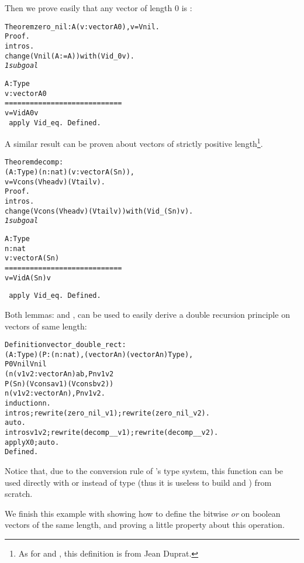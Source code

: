 \documentclass[11pt]{article}
\begin{document}
Then we prove easily that any vector of length 0 is :

\begin{alltt}
Theorem zero_nil : {\prodsym} A (v:vector A 0), v = Vnil.
Proof.
 intros.
 change (Vnil (A:=A)) with (Vid _ 0 v). 
\it
1 subgoal
  
  A : Type
  v : vector A 0
  ============================
   v = Vid A 0 v
\tt
 apply Vid_eq.
Defined.
\end{alltt}

A similar result can be proven about vectors of strictly positive
length\footnote{As for  and , this definition 
is from Jean Duprat.}.

\begin{alltt}


Theorem decomp :
  {\prodsym} (A : Type) (n : nat) (v : vector A (S n)),
  v = Vcons (Vhead v) (Vtail v).
Proof.
 intros.
 change (Vcons (Vhead v) (Vtail v)) with (Vid _  (S n) v).
\it
 1 subgoal
  
  A : Type
  n : nat
  v : vector A (S n)
  ============================
   v = Vid A (S n) v

\tt{} apply Vid_eq.
Defined.
\end{alltt}


Both lemmas:  and ,
can be used to easily derive a double recursion principle
on vectors of same length:


\begin{alltt}
Definition vector_double_rect : 
 {\prodsym} (A:Type) (P: {\prodsym} (n:nat),(vector A n){\arrow}(vector A n) {\arrow} Type),
     P 0 Vnil Vnil {\arrow}
     ({\prodsym} n (v1 v2 : vector A n) a b, P n v1 v2 {\arrow}
          P (S n) (Vcons a v1) (Vcons  b v2)) {\arrow}
     {\prodsym} n (v1 v2 : vector A n), P n v1 v2.
 induction n.
 intros; rewrite (zero_nil _ v1); rewrite (zero_nil _ v2).
 auto.
 intros v1 v2; rewrite (decomp _ _ v1);rewrite (decomp _ _ v2).
 apply X0; auto.
Defined.
\end{alltt}

Notice that, due to the conversion rule of {\coq}'s type system,
this function can be used directly with  or 
instead of type (thus it is useless to build 
 and ) from scratch.

We finish this example with showing how to define the bitwise
\emph{or} on boolean vectors of the same length, 
and proving a little property about this
operation.
\end{document}
